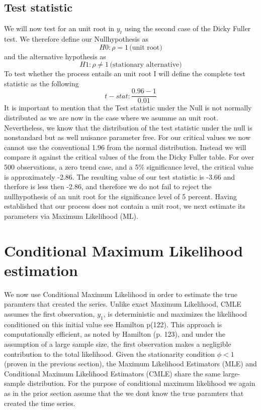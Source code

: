 \documentclass[a4paper,12pt]{article}
\begin{document}
\subsection{Test statistic}
We will now  test for an unit root in $y_t$ using the second case of the Dicky Fuller test. 
We therefore define our Nullhypothesis as 
$$H0 : \rho = 1 \, \text{(unit root)}$$
and the alternative hypothesis as 
$$H1: \rho \neq 1 \, \text{(stationary alternative)}$$
To test whether the process entails an unit root I will define the complete test statistic as the following
$$t-stat: \frac{0.96-1}{0.01}$$
It is important to mention that the Test statistic under the Null is not normally distributed as we are now in the case where we asumme an unit root. Nevertheless, we know that the distribution of the test statistic under the null is nonstandard but as well nuisance parameter free. For our critical values we now cannot use the conventional 1.96 from the normal distribution. Instead we will compare it  against the critical values of the from the Dicky Fuller table.
 For over 500 observations, a zero trend case, and a 5\% significance level, the critical value is approximately -2.86.
The resulting value of our test statistic is -3.66 and therfore is less then -2.86, and therefore we do not fail to reject the nullhypothesis of an unit root for the significance level of 5 percent.
Having established that our process does not contain a unit root, we next estimate its parameters via Maximum Likelihood (ML). 



\section{Conditional Maximum Likelihood estimation}
We now use Conditional Maximum Likelihood in order to estimate the true paramters that created the series. 
Unlike exact Maximum Likelihood, CMLE assumes the first observation, $y_1$, is deterministic and maximizes the likelihood conditioned on this initial value see Hamilton p(122).
This approach is computationally efficient, as noted by Hamilton (p. 123), and under the assumption of a large sample size, the first observation makes a negligible contribution to the total likelihood. 
Given the stationarity condition $\phi < 1$ (proven in the previous section), the Maximum Likelihood Estimators (MLE) and Conditional Maximum Likelihood Estimators (CMLE) share the same large-sample distribution.
For the purpose of conditional maximum likelihood we again as in the prior section assume that the we dont know the true paramters that created the time series.
\end{document}
